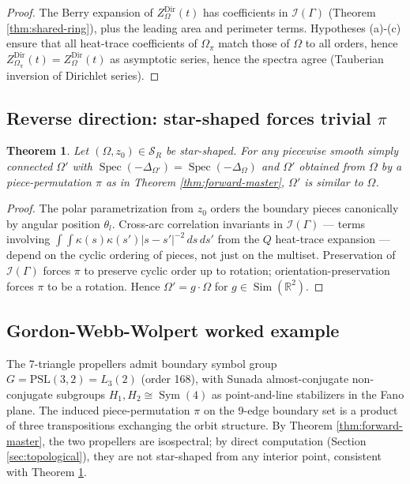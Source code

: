 \documentclass[11pt,reqno]{amsart}
\theoremstyle{plain}
\newtheorem{theorem}{Theorem}[section]
\theoremstyle{definition}
\theoremstyle{remark}
\DeclareMathOperator{\Spec}{Spec}
\DeclareMathOperator{\Sim}{Sim}
\DeclareMathOperator{\Sym}{Sym}
\newcommand{\Reals}{\mathbb{R}}
\newcommand{\Scal}{\mathcal{S}}
\newcommand{\Qop}{Q}
\newcommand{\Icalbb}{\mathcal{I}}
\begin{document}
\begin{proof}
The Berry expansion of $Z_\Omega^{\mathrm{Dir}}(t)$ has coefficients in $\Icalbb(\Gamma)$ (Theorem \ref{thm:shared-ring}), plus the leading area and perimeter terms. Hypotheses (a)-(c) ensure that all heat-trace coefficients of $\Omega_\pi$ match those of $\Omega$ to all orders, hence $Z_{\Omega_\pi}^{\mathrm{Dir}}(t) = Z_\Omega^{\mathrm{Dir}}(t)$ as asymptotic series, hence the spectra agree (Tauberian inversion of Dirichlet series).
\end{proof}

\subsection{Reverse direction: star-shaped forces trivial $\pi$}\label{ss:reverse-master}

\begin{theorem}\label{thm:reverse-master}
Let $(\Omega, z_0) \in \Scal_R$ be star-shaped. For any piecewise smooth simply connected $\Omega'$ with $\Spec(-\Delta_{\Omega'}) = \Spec(-\Delta_\Omega)$ and $\Omega'$ obtained from $\Omega$ by a piece-permutation $\pi$ as in Theorem \ref{thm:forward-master}, $\Omega'$ is similar to $\Omega$.
\end{theorem}

\begin{proof}
The polar parametrization from $z_0$ orders the boundary pieces canonically by angular position $\theta_l$. Cross-arc correlation invariants in $\Icalbb(\Gamma)$ — terms involving $\int\int \kappa(s)\kappa(s')|s-s'|^{-2}\,ds\,ds'$ from the $\Qop$ heat-trace expansion — depend on the cyclic ordering of pieces, not just on the multiset. Preservation of $\Icalbb(\Gamma)$ forces $\pi$ to preserve cyclic order up to rotation; orientation-preservation forces $\pi$ to be a rotation. Hence $\Omega' = g\cdot\Omega$ for $g \in \Sim(\Reals^2)$.
\end{proof}

\subsection{Gordon-Webb-Wolpert worked example}\label{ss:gww-worked-master}

The 7-triangle propellers \cite{GWW, BCDS} admit boundary symbol group $G = \mathrm{PSL}(3, 2) = L_3(2)$ (order 168), with Sunada almost-conjugate non-conjugate subgroups $H_1, H_2 \cong \Sym(4)$ as point-and-line stabilizers in the Fano plane. The induced piece-permutation $\pi$ on the 9-edge boundary set is a product of three transpositions exchanging the orbit structure. By Theorem \ref{thm:forward-master}, the two propellers are isospectral; by direct computation (Section \ref{sec:topological}), they are not star-shaped from any interior point, consistent with Theorem \ref{thm:reverse-master}.
\end{document}
